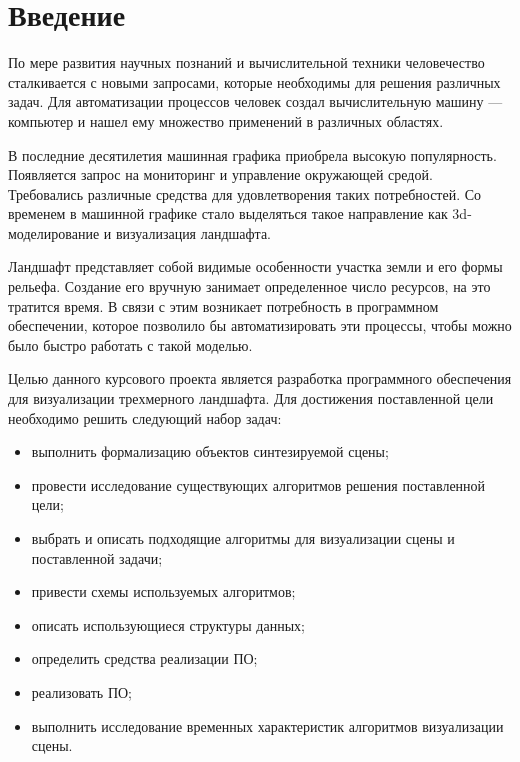 \chapter*{Введение}
По мере развития научных познаний и вычислительной техники человечество сталкивается с новыми запросами, которые необходимы для решения различных задач. Для автоматизации процессов человек создал вычислительную машину — компьютер и нашел ему множество применений в различных областях.

В последние десятилетия машинная графика приобрела высокую популярность. Появляется запрос на мониторинг и управление окружающей средой. Требовались различные средства для удовлетворения таких потребностей. Со временем в машинной графике стало выделяться такое направление как 3d-моделирование и визуализация ландшафта.

Ландшафт представляет собой видимые особенности участка земли и его формы рельефа. Создание его вручную занимает определенное число ресурсов, на это тратится время. В связи с этим возникает потребность в программном обеспечении, которое позволило бы автоматизировать эти процессы, чтобы можно было быстро работать с такой моделью.

Целью данного курсового проекта является разработка программного обеспечения для визуализации трехмерного ландшафта. Для достижения поставленной цели необходимо решить следующий набор задач:
\begin{itemize}
	\item выполнить формализацию объектов синтезируемой сцены;
	\item провести исследование существующих алгоритмов решения поставленной цели;
	\item выбрать и описать подходящие алгоритмы для визуализации сцены и поставленной задачи;
	\item привести схемы используемых алгоритмов;
	\item описать использующиеся структуры данных;
	\item определить средства реализации ПО;
	\item реализовать ПО;
	\item выполнить исследование временных характеристик алгоритмов визуализации сцены.
\end{itemize}